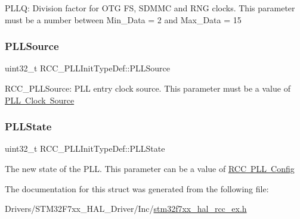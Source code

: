 P\+L\+LQ\+: Division factor for O\+TG FS, S\+D\+M\+MC and R\+NG clocks. This parameter must be a number between Min\+\_\+\+Data = 2 and Max\+\_\+\+Data = 15 \mbox{\label{struct_r_c_c___p_l_l_init_type_def_a72806832a179af8756b9330de7f7c6a8}} 
\subsubsection{\texorpdfstring{PLLSource}{PLLSource}}
{\footnotesize\ttfamily uint32\+\_\+t R\+C\+C\+\_\+\+P\+L\+L\+Init\+Type\+Def\+::\+P\+L\+L\+Source}

R\+C\+C\+\_\+\+P\+L\+L\+Source\+: P\+LL entry clock source. This parameter must be a value of \mbox{\hyperlink{group___r_c_c___p_l_l___clock___source}{P\+LL Clock Source}} \mbox{\label{struct_r_c_c___p_l_l_init_type_def_a6cbaf84f6566af15e6e4f97a339d5759}} 
\subsubsection{\texorpdfstring{PLLState}{PLLState}}
{\footnotesize\ttfamily uint32\+\_\+t R\+C\+C\+\_\+\+P\+L\+L\+Init\+Type\+Def\+::\+P\+L\+L\+State}

The new state of the P\+LL. This parameter can be a value of \mbox{\hyperlink{group___r_c_c___p_l_l___config}{R\+CC P\+LL Config}} 

The documentation for this struct was generated from the following file\+:\begin{DoxyCompactItemize}
\item 
Drivers/\+S\+T\+M32\+F7xx\+\_\+\+H\+A\+L\+\_\+\+Driver/\+Inc/\mbox{\hyperlink{stm32f7xx__hal__rcc__ex_8h}{stm32f7xx\+\_\+hal\+\_\+rcc\+\_\+ex.\+h}}\end{DoxyCompactItemize}
